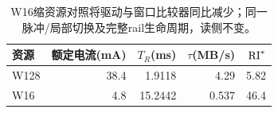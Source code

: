 \begin{table}[htbp]\centering\small
\begin{tabular}{@{}lrrrr@{}}\toprule
资源 & 额定电流(mA) & $T_R$(ms) & $\tau$(MB/s) & $\mathrm{RI}^*$\\\midrule
W128 & 38.4 & 1.9118 & 4.29 & 5.82\\
W16 & 4.8 & 15.2442 & 0.537 & 46.4\\
\bottomrule\end{tabular}
\caption{W16缩资源对照将驱动与窗口比较器同比减少；同一脉冲/局部切换及完整rail生命周期，读侧不变。}\end{table}
